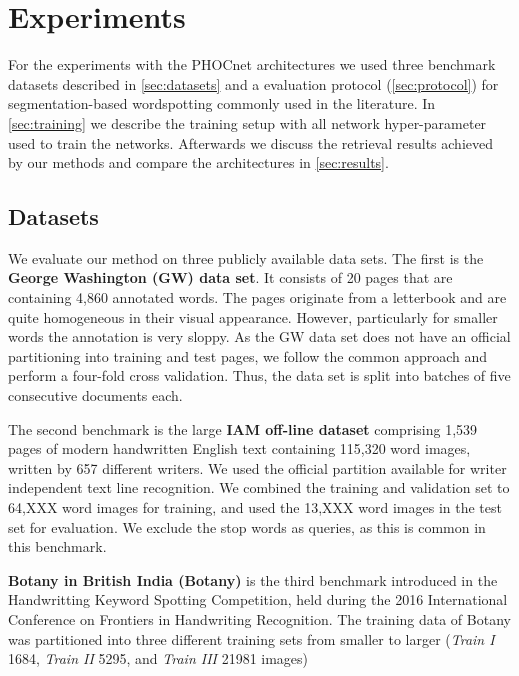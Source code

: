 \section{Experiments}\label{sec:evaluation}
%
For the experiments with the PHOCnet architectures we used three benchmark datasets described in \autoref{sec:datasets} 
and a evaluation protocol (\autoref{sec:protocol}) for segmentation-based wordspotting commonly used in the literature. 
In \autoref{sec:training} we describe the training setup with all network hyper-parameter used to train the networks.
Afterwards we discuss the retrieval results achieved by our methods and compare the architectures in \autoref{sec:results}.
%
%
\subsection{Datasets}\label{sec:datasets}
%
We evaluate our method on three publicly available data sets. 
The first is the \textbf{George Washington (GW) data set}. 
It consists of 20 pages that are containing 4,860 annotated words.
The pages originate from a letterbook and are quite homogeneous in their visual appearance.
However, particularly for smaller words the annotation is very sloppy. As the GW data set does
not have an official partitioning into training and test pages, we follow the common approach
and perform a four-fold cross validation. Thus, the data set is split into batches of five
consecutive documents each.

The second benchmark is the large \textbf{IAM off-line dataset} comprising 1,539 pages of 
modern handwritten English text containing 115,320 word images, written by 657 different writers. 
We used the official partition available for writer independent text line recognition. We combined the training and 
validation set to 64,XXX word images for training, and used the 13,XXX word images in the test set for evaluation. 
We exclude the stop words as queries, as this is common in this benchmark.

\textbf{Botany in British India (Botany)} is the third benchmark introduced in the Handwritting 
Keyword Spotting Competition, held during the 2016 International Conference on Frontiers in 
Handwriting Recognition. The training data of Botany was partitioned into three different 
training sets from smaller to larger (\textit{Train \RN{1}} 1684, \textit{Train \RN{2}} 5295, and \textit{Train \RN{3}} 21981 images) 
%
%
